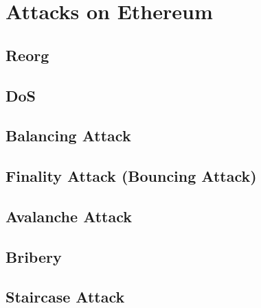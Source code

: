 \section{Attacks on Ethereum}\label{sec:attacks-on-ethereum}
\subsection{Reorg}\label{subsec:reorg}

\subsection{DoS}\label{subsec:dos}

\subsection{Balancing Attack}\label{subsec:balancing-attack}

\subsection{Finality Attack (Bouncing Attack)}\label{subsec:finality-attack-(bouncing-attack)}

\subsection{Avalanche Attack}\label{subsec:avalanche-attack}

\subsection{Bribery}\label{subsec:bribery}

\subsection{Staircase Attack}\label{subsec:staircase-attack}